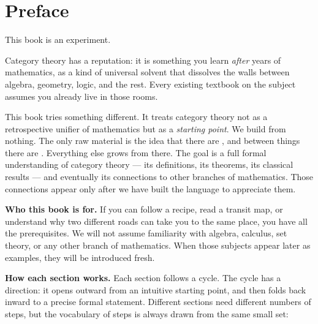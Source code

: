 \chapter*{Preface}

This book is an experiment.

Category theory has a reputation: it is something you learn \emph{after} years
of mathematics, as a kind of universal solvent that dissolves the walls between
algebra, geometry, logic, and the rest. Every existing textbook on the subject
assumes you already live in those rooms.

This book tries something different. It treats category theory not as a
retrospective unifier of mathematics but as a \emph{starting point}. We build
from nothing. The only raw material is the idea that there are ,
and between things there are . Everything else grows from
there. The goal is a full formal understanding of category theory — its
definitions, its theorems, its classical results — and eventually its
connections to other branches of mathematics. Those connections appear only
after we have built the language to appreciate them.

\bigskip

\textbf{Who this book is for.} If you can follow a recipe, read a transit map,
or understand why two different roads can take you to the same place, you have
all the prerequisites. We will not assume familiarity with algebra, calculus,
set theory, or any other branch of mathematics. When those subjects appear
later as examples, they will be introduced fresh.

\bigskip

\textbf{How each section works.} Each section follows a cycle. The cycle has
a direction: it opens outward from an intuitive starting point, and then folds
back inward to a precise formal statement. Different sections need different
numbers of steps, but the vocabulary of steps is always drawn from the same
small set:

